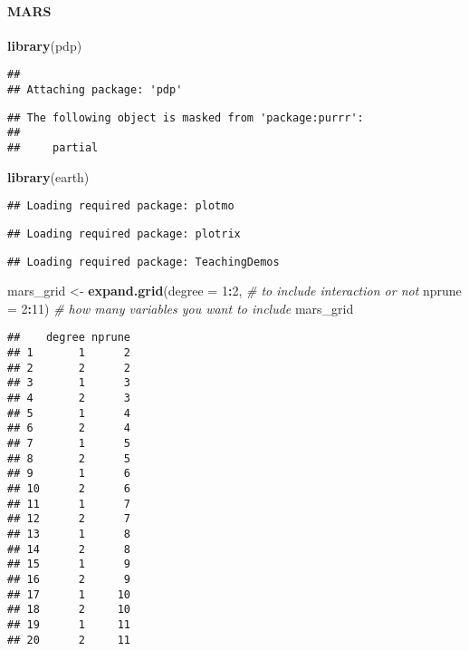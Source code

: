 \documentclass[]{article}
\newenvironment{Shaded}{\begin{snugshade}}{\end{snugshade}}
\newcommand{\KeywordTok}[1]{\textcolor[rgb]{0.13,0.29,0.53}{\textbf{#1}}}
\newcommand{\DataTypeTok}[1]{\textcolor[rgb]{0.13,0.29,0.53}{#1}}
\newcommand{\DecValTok}[1]{\textcolor[rgb]{0.00,0.00,0.81}{#1}}
\newcommand{\StringTok}[1]{\textcolor[rgb]{0.31,0.60,0.02}{#1}}
\newcommand{\CommentTok}[1]{\textcolor[rgb]{0.56,0.35,0.01}{\textit{#1}}}
\newcommand{\OperatorTok}[1]{\textcolor[rgb]{0.81,0.36,0.00}{\textbf{#1}}}
\newcommand{\NormalTok}[1]{#1}
\let\oldparagraph\paragraph
\renewcommand{\paragraph}[1]{\oldparagraph{#1}\mbox{}}
\begin{document}
\paragraph{MARS}\label{mars}

\begin{Shaded}
\begin{Highlighting}[]
\KeywordTok{library}\NormalTok{(pdp)}
\end{Highlighting}
\end{Shaded}

\begin{verbatim}
## 
## Attaching package: 'pdp'
\end{verbatim}

\begin{verbatim}
## The following object is masked from 'package:purrr':
## 
##     partial
\end{verbatim}

\begin{Shaded}
\begin{Highlighting}[]
\KeywordTok{library}\NormalTok{(earth)}
\end{Highlighting}
\end{Shaded}

\begin{verbatim}
## Loading required package: plotmo
\end{verbatim}

\begin{verbatim}
## Loading required package: plotrix
\end{verbatim}

\begin{verbatim}
## Loading required package: TeachingDemos
\end{verbatim}

\begin{Shaded}
\begin{Highlighting}[]
\NormalTok{mars_grid <-}\StringTok{ }\KeywordTok{expand.grid}\NormalTok{(}\DataTypeTok{degree =} \DecValTok{1}\OperatorTok{:}\DecValTok{2}\NormalTok{,  }\CommentTok{# to include interaction or not}
                         \DataTypeTok{nprune =} \DecValTok{2}\OperatorTok{:}\DecValTok{11}\NormalTok{) }\CommentTok{# how many variables you want to include}
\NormalTok{mars_grid}
\end{Highlighting}
\end{Shaded}

\begin{verbatim}
##    degree nprune
## 1       1      2
## 2       2      2
## 3       1      3
## 4       2      3
## 5       1      4
## 6       2      4
## 7       1      5
## 8       2      5
## 9       1      6
## 10      2      6
## 11      1      7
## 12      2      7
## 13      1      8
## 14      2      8
## 15      1      9
## 16      2      9
## 17      1     10
## 18      2     10
## 19      1     11
## 20      2     11
\end{verbatim}
\end{document}
